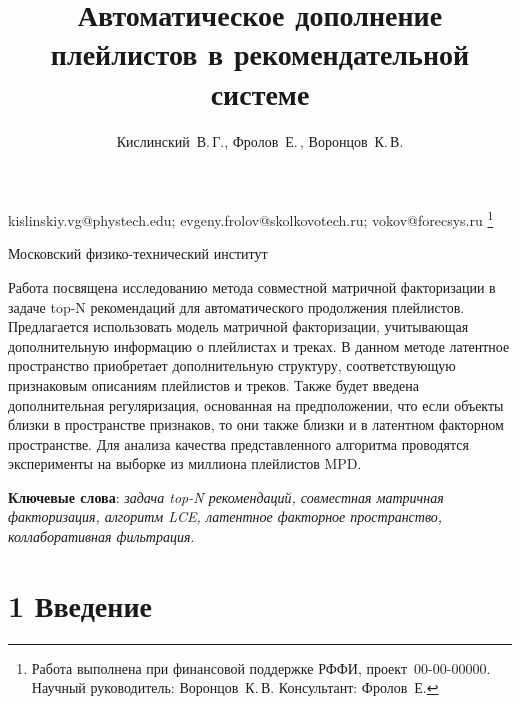 \documentclass[12pt,twoside]{article}
\begin{document}
\title
    {Автоматическое дополнение плейлистов в рекомендательной системе}
\author
    {Кислинский~В.\,Г., Фролов~Е.\,, Воронцов~К.\,В.} %
\email
    {kislinskiy.vg@phystech.edu; evgeny.frolov@skolkovotech.ru; vokov@forecsys.ru}
\thanks
    {Работа выполнена при финансовой поддержке РФФИ, проект \No\,00-00-00000.
     Научный руководитель:  Воронцов~К.\,В.
     Консультант:  Фролов~Е.}

\organization
    {Московский физико-технический институт}
\abstract
	{Работа посвящена исследованию метода совместной матричной факторизации в задаче top-N рекомендаций для автоматического продолжения плейлистов. Предлагается использовать модель матричной факторизации, учитывающая дополнительную информацию о плейлистах и треках. В данном методе латентное пространство приобретает дополнительную структуру, соответствующую признаковым описаниям плейлистов и треков. Также будет введена дополнительная регуляризация, основанная на предположении, что если объекты близки в пространстве признаков, то они также близки и в латентном факторном пространстве. Для анализа качества представленного алгоритма проводятся эксперименты на выборке  из миллиона плейлистов MPD. 

\bigskip
\textbf{Ключевые слова}: \emph {задача top-N рекомендаций, совместная матричная факторизация, алгоритм LCE, латентное факторное пространство, коллаборативная фильтрация}.

}

\maketitle

\section{1 Введение}
\end{document}
